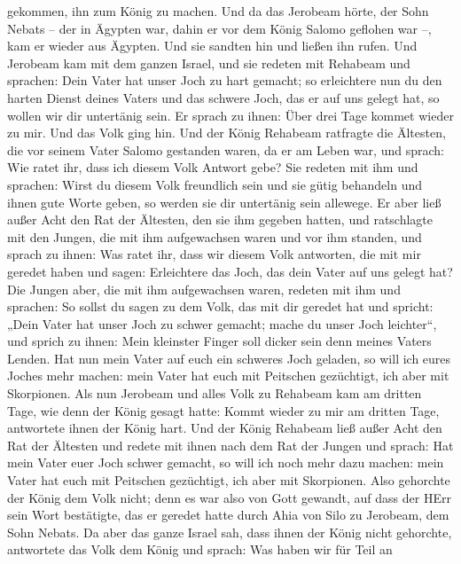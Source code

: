 gekommen, ihn zum König zu machen.  Und da das Jerobeam
hörte, der Sohn Nebats -- der in Ägypten war, dahin er vor dem König
Salomo geflohen war --, kam er wieder aus Ägypten.  Und sie
sandten hin und ließen ihn rufen. Und Jerobeam kam mit dem ganzen
Israel, und sie redeten mit Rehabeam und sprachen:  Dein
Vater hat unser Joch zu hart gemacht; so erleichtere nun du den harten
Dienst deines Vaters und das schwere Joch, das er auf uns gelegt hat, so
wollen wir dir untertänig sein.  Er sprach zu ihnen: Über
drei Tage kommet wieder zu mir. Und das Volk ging hin.  Und
der König Rehabeam ratfragte die Ältesten, die vor seinem Vater Salomo
gestanden waren, da er am Leben war, und sprach: Wie ratet ihr, dass ich
diesem Volk Antwort gebe?  Sie redeten mit ihm und sprachen:
Wirst du diesem Volk freundlich sein und sie gütig behandeln und ihnen
gute Worte geben, so werden sie dir untertänig sein allewege.
 Er aber ließ außer Acht den Rat der Ältesten, den sie ihm
gegeben hatten, und ratschlagte mit den Jungen, die mit ihm aufgewachsen
waren und vor ihm standen,  und sprach zu ihnen: Was ratet
ihr, dass wir diesem Volk antworten, die mit mir geredet haben und
sagen: Erleichtere das Joch, das dein Vater auf uns gelegt hat?
 Die Jungen aber, die mit ihm aufgewachsen waren, redeten
mit ihm und sprachen: So sollst du sagen zu dem Volk, das mit dir
geredet hat und spricht: „Dein Vater hat unser Joch zu schwer gemacht;
mache du unser Joch leichter``, und sprich zu ihnen: Mein kleinster
Finger soll dicker sein denn meines Vaters Lenden.  Hat nun
mein Vater auf euch ein schweres Joch geladen, so will ich eures Joches
mehr machen: mein Vater hat euch mit Peitschen gezüchtigt, ich aber mit
Skorpionen.  Als nun Jerobeam und alles Volk zu Rehabeam
kam am dritten Tage, wie denn der König gesagt hatte: Kommt wieder zu
mir am dritten Tage,  antwortete ihnen der König hart. Und
der König Rehabeam ließ außer Acht den Rat der Ältesten 
und redete mit ihnen nach dem Rat der Jungen und sprach: Hat mein Vater
euer Joch schwer gemacht, so will ich noch mehr dazu machen: mein Vater
hat euch mit Peitschen gezüchtigt, ich aber mit Skorpionen.
 Also gehorchte der König dem Volk nicht; denn es war also
von Gott gewandt, auf dass der HErr sein Wort bestätigte, das er geredet
hatte durch Ahia von Silo zu Jerobeam, dem Sohn Nebats.  Da
aber das ganze Israel sah, dass ihnen der König nicht gehorchte,
antwortete das Volk dem König und sprach: Was haben wir für Teil an
